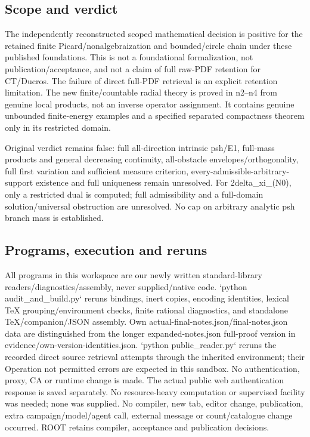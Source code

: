 \documentclass[11pt]{article}
\begin{document}
\subsection*{Scope and verdict}

The independently reconstructed scoped mathematical decision is positive for the retained finite Picard/nonalgebraization and bounded/circle chain under these published foundations. This is not a foundational formalization, not publication/acceptance, and not a claim of full raw-PDF retention for CT/Ducros. The failure of direct full-PDF retrieval is an explicit retention limitation. The new finite/countable radial theory is proved in n2--n4 from genuine local products, not an inverse operator assignment. It contains genuine unbounded finite-energy examples and a specified separated compactness theorem only in its restricted domain.

Original verdict remains false: full all-direction intrinsic psh/E1, full-mass products and general decreasing continuity, all-obstacle envelopes/orthogonality, full first variation and sufficient measure criterion, every-admissible-arbitrary-support existence and full uniqueness remain unresolved. For 2delta\_xi\_(N0), only a restricted dual is computed; full admissibility and a full-domain solution/universal obstruction are unresolved. No cap on arbitrary analytic psh branch mass is established.

\subsection*{Programs, execution and reruns}

All programs in this workspace are our newly written standard-library readers/diagnostics/assembly, never supplied/native code. `python audit\_and\_build.py` reruns bindings, inert copies, encoding identities, lexical TeX grouping/environment checks, finite rational diagnostics, and standalone TeX/companion/JSON assembly. Own actual-final-notes.json/final-notes.json data are distinguished from the longer expanded-notes.json full-proof version in evidence/own-version-identities.json. `python public\_reader.py` reruns the recorded direct source retrieval attempts through the inherited environment; their Operation not permitted errors are expected in this sandbox. No authentication, proxy, CA or runtime change is made. The actual public web authentication response is saved separately. No resource-heavy computation or supervised facility was needed; none was supplied. No compiler, new tab, editor change, publication, extra campaign/model/agent call, external message or count/catalogue change occurred. ROOT retains compiler, acceptance and publication decisions.
\end{document}
